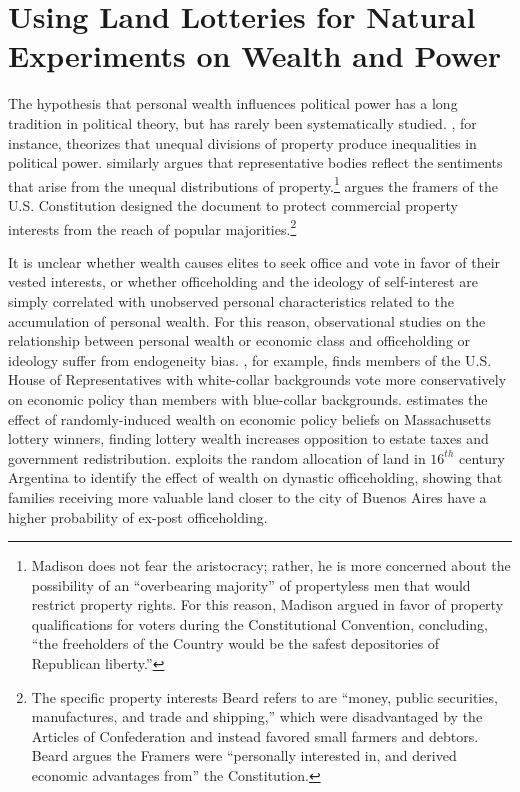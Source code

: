 \chapter{Using Land Lotteries for Natural Experiments on Wealth and Power} \label{land-lotteries}

The hypothesis that personal wealth influences political power has a long tradition in political theory, but has rarely been systematically studied. \citet{ferguson1767}, for instance, theorizes that unequal divisions of property produce inequalities in political power. \citet{madison1787} similarly argues that representative bodies reflect the sentiments that arise from the unequal distributions of property.\footnote{Madison does not fear the aristocracy; rather, he is more concerned about the possibility of an ``overbearing majority'' of propertyless men that would restrict property rights. For this reason, Madison argued in favor of property qualifications for voters during the Constitutional Convention, concluding, ``the freeholders of the Country would be the safest depositories of Republican liberty.''} \citet{beard1913} argues the framers of the U.S. Constitution designed the document to protect commercial property interests from the reach of popular majorities.\footnote{The specific property interests Beard refers to are ``money, public securities, manufactures, and trade and shipping,'' which were disadvantaged by the Articles of Confederation and instead favored small farmers and debtors. Beard argues the Framers were ``personally interested in, and derived economic advantages from'' the Constitution.} 

It is unclear whether wealth causes elites to seek office and vote in favor of their vested interests, or whether officeholding and the ideology of self-interest are simply correlated with unobserved personal characteristics related to the accumulation of personal wealth. For this reason, observational studies on the relationship between personal wealth or economic class and officeholding or ideology suffer from endogeneity bias. \citet{carnes2012}, for example, finds members of the U.S. House of Representatives with white-collar backgrounds vote more conservatively on economic policy than members with blue-collar backgrounds. \citet{doherty2006} estimates the effect of randomly-induced wealth on economic policy beliefs on Massachusetts lottery winners, finding lottery wealth increases opposition to estate taxes and government redistribution. \citet{rossi2014} exploits the random allocation of land in $16^{th}$ century Argentina to identify the effect of wealth on dynastic officeholding, showing that families receiving more valuable land closer to the city of Buenos Aires have a higher probability of ex-post officeholding. 

